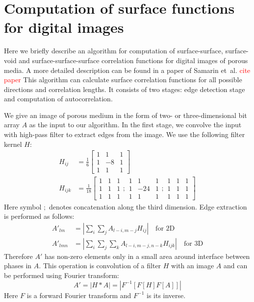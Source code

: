 \documentclass[reprint,amsmath,amssymb,aps,pre,showkeys,showpacs]{revtex4-1}
\begin{document}
\section{Computation of surface functions for digital images}
\label{sec:algo}
Here we briefly describe an algorithm for computation of surface-surface,
surface-void and surface-surface-surface correlation functions for digital
images of porous media. A more detailed description can be found in a paper of
Samarin et~al. \textcolor{red}{cite paper} This algorithm can calculate surface
correlation functions for all possible directions and correlation lengths. It
consists of two stages: edge detection stage and computation of autocorrelation.

We give an image of porous medium in the form of two- or three-dimensional bit
array $A$ as the input to our algorithm. In the first stage, we convolve the
input with high-pass filter to extract edges from the image. We use the
following filter kernel $H$:
\begin{equation}
  \begin{aligned}
    H_{ij} &= \frac{1}{6} \left[
      \begin{array}{ccc}
        1 & 1 & 1 \\
        1 & -8 & 1 \\
        1 & 1 & 1
      \end{array}
      \right] \\
    H_{ijk} &= \frac{1}{18} \left[
      \begin{array}{ccc}
        1 & 1 & 1 \\
        1 & 1 & 1 \\
        1 & 1 & 1
      \end{array} ;
      \begin{array}{ccc}
        1 & 1 & 1 \\
        1 & -24 & 1 \\
        1 & 1 & 1
      \end{array} ;
      \begin{array}{ccc}
        1 & 1 & 1 \\
        1 & 1 & 1 \\
        1 & 1 & 1
      \end{array}
      \right]
  \end{aligned}
  \label{eq:filter-3x3}
\end{equation}
Here symbol $;$ denotes concatenation along the third dimension. Edge extraction
is performed as follows:
\begin{align*}
  A'_{lm}  &= \left| \sum_i\sum_j A_{l-i, m-j}H_{ij} \right| \quad \text{for 2D} \\
  A'_{lmn} &= \left| \sum_i\sum_j\sum_k A_{l-i, m-j, n-k}H_{ijk} \right| \quad
  \text{for 3D}
\end{align*}
Therefore $A'$ has non-zero elements only in a small area around interface
between phases in $A$. This operation is convolution of a filter $H$ with an
image $A$ and can be performed using Fourier transform:
\begin{equation*}
  A' = |H*A| = |F^{-1}[F[H] F[A]]|
\end{equation*}
Here $F$ is a forward Fourier transform and $F^{-1}$ is its inverse.
\end{document}
